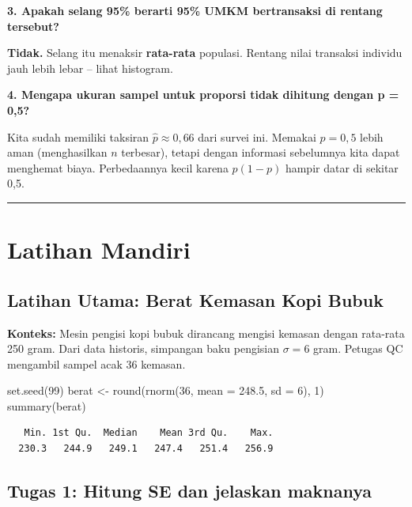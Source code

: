 \documentclass[
  indonesian,
  letterpaper,
]{book}
\newenvironment{Shaded}{\begin{snugshade}}{\end{snugshade}}
\newcommand{\AttributeTok}[1]{\textcolor[rgb]{0.40,0.45,0.13}{#1}}
\newcommand{\DecValTok}[1]{\textcolor[rgb]{0.68,0.00,0.00}{#1}}
\newcommand{\FloatTok}[1]{\textcolor[rgb]{0.68,0.00,0.00}{#1}}
\newcommand{\FunctionTok}[1]{\textcolor[rgb]{0.28,0.35,0.67}{#1}}
\newcommand{\NormalTok}[1]{\textcolor[rgb]{0.00,0.23,0.31}{#1}}
\newcommand{\OtherTok}[1]{\textcolor[rgb]{0.00,0.23,0.31}{#1}}
\begin{document}
\textbf{3. Apakah selang 95\% berarti 95\% UMKM bertransaksi di rentang
tersebut?}

\textbf{Tidak.} Selang itu menaksir \textbf{rata-rata} populasi. Rentang
nilai transaksi individu jauh lebih lebar -- lihat histogram.

\textbf{4. Mengapa ukuran sampel untuk proporsi tidak dihitung dengan p
= 0,5?}

Kita sudah memiliki taksiran \(\hat{p} \approx 0{,}66\) dari survei ini.
Memakai \(p = 0{,}5\) lebih aman (menghasilkan \(n\) terbesar), tetapi
dengan informasi sebelumnya kita dapat menghemat biaya. Perbedaannya
kecil karena \(p(1-p)\) hampir datar di sekitar 0,5.

\begin{center}\rule{0.5\linewidth}{0.5pt}\end{center}

\section{Latihan Mandiri}\label{latihan-mandiri}

\subsection{Latihan Utama: Berat Kemasan Kopi
Bubuk}\label{latihan-utama-berat-kemasan-kopi-bubuk}

\textbf{Konteks:} Mesin pengisi kopi bubuk dirancang mengisi kemasan
dengan rata-rata 250 gram. Dari data historis, simpangan baku pengisian
\(\sigma = 6\) gram. Petugas QC mengambil sampel acak 36 kemasan.

\begin{Shaded}
\begin{Highlighting}[]
\FunctionTok{set.seed}\NormalTok{(}\DecValTok{99}\NormalTok{)}
\NormalTok{berat }\OtherTok{\textless{}{-}} \FunctionTok{round}\NormalTok{(}\FunctionTok{rnorm}\NormalTok{(}\DecValTok{36}\NormalTok{, }\AttributeTok{mean =} \FloatTok{248.5}\NormalTok{, }\AttributeTok{sd =} \DecValTok{6}\NormalTok{), }\DecValTok{1}\NormalTok{)}
\FunctionTok{summary}\NormalTok{(berat)}
\end{Highlighting}
\end{Shaded}

\begin{verbatim}
   Min. 1st Qu.  Median    Mean 3rd Qu.    Max. 
  230.3   244.9   249.1   247.4   251.4   256.9 
\end{verbatim}

\subsection{Tugas 1: Hitung SE dan jelaskan
maknanya}\label{tugas-1-hitung-se-dan-jelaskan-maknanya}
\end{document}
